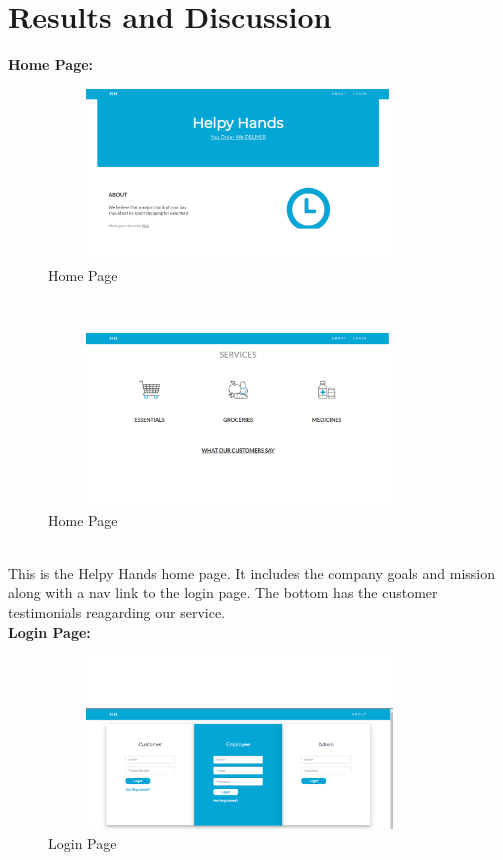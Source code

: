 \documentclass[12pt,a4paper]{report}
\begin{document}
\chapter{Results and Discussion}
\textbf{Home Page:}\\
\begin{figure}[hbtp]
\centering
\includegraphics[width=4in,height=1.8in]{../fig/home1}
\caption{Home Page}
\end{figure}\\
\noindent
\begin{figure}[hbtp]
\centering
\includegraphics[width=4in,height=1.8in]{../fig/home2}
\caption{Home Page}
\end{figure}\\
\noindent
This is the Helpy Hands home page. It includes the company goals and mission along with a nav link to the login page. The bottom has the customer testimonials reagarding our service.\\
\linebreak
\textbf{Login Page:}\\
\begin{figure}[hbtp]
\centering
\includegraphics[width=4in,height=1.8in]{../fig/loginpage}
\caption{Login Page}
\end{figure}\\
\end{document}
